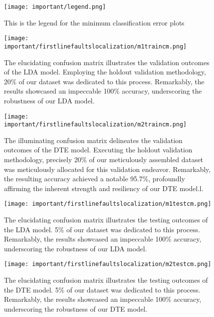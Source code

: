 \documentclass[8pt,a4paper,oneside]{elsarticle}
\begin{document}
\begin{figure}[H]
    \centering
    \texttt{[image: important/legend.png]}
    \caption{This is the legend for the minimum classification error plots}
    \label{0_figure:legend}
\end{figure}
\begin{figure}[H]
    \centering
    \texttt{[image: important/firstlinefaultslocalization/m1traincm.png]}
    \caption{The elucidating confusion matrix illustrates the validation outcomes of the LDA model. Employing the holdout validation methodology, 20\% of our dataset was dedicated to this process. Remarkably, the results showcased an impeccable 100\% accuracy, underscoring the robustness of our LDA model. }
    \label{0_fig:17_model1traincm}
\end{figure}
\begin{figure}[H]
    \centering
    \texttt{[image: important/firstlinefaultslocalization/m2traincm.png]}
    \caption{The illuminating confusion matrix delineates the validation outcomes of the DTE model. Executing the holdout validation methodology, precisely 20\% of our meticulously assembled dataset was meticulously allocated for this validation endeavor. Remarkably, the resulting accuracy achieved a notable 95.7\%, profoundly affirming the inherent strength and resiliency of our DTE model.l. }
    \label{0_fig:18_model2traincm}
\end{figure}
\begin{figure}[H]
    \centering
    \texttt{[image: important/firstlinefaultslocalization/m1testcm.png]}
    \caption{The elucidating confusion matrix illustrates the testing outcomes of the LDA model. 5\% of our dataset was dedicated to this process. Remarkably, the results showcased an impeccable 100\% accuracy, underscoring the robustness of our LDA model.
}
    \label{0_fig:19_model1testcm}
\end{figure}
\begin{figure}[H]
    \centering
    \texttt{[image: important/firstlinefaultslocalization/m2testcm.png]}
    \caption{The elucidating confusion matrix illustrates the testing outcomes of the DTE model. 5\% of our dataset was dedicated to this process. Remarkably, the results showcased an impeccable 100\% accuracy, underscoring the robustness of our DTE model.
}
    \label{0_fig:20_model2testcm}
\end{figure}
\end{document}
